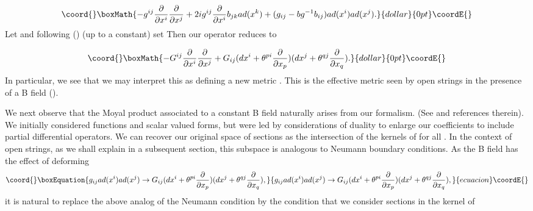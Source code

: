 \documentclass[a4paper,11pt]{amsart}
\begin{document}
$$\coord{}\boxMath{-g^{ij}\frac{\partial}{\partial x^i}\frac{\partial}{\partial x^j}
+ 2ig^{ij}\frac{\partial}{\partial x^i}b_{jk}ad(x^k)
+ (g_{ij}-bg^{-1}b_{ij})ad(x^i)ad(x^j).}{dollar}{0pt}\coordE{}$$ 
Let \coordHE{} and following (\cite{SW})
(up to a constant) set \coordHE{} 
Then our operator reduces to 

$$\coord{}\boxMath{-G^{ij}\frac{\partial}{\partial x^i}\frac{\partial}{\partial x^j}
+ G_{ij}(dx^i+\theta^{pi}\frac{\partial}{\partial x_p})
(dx^j+\theta^{qj}\frac{\partial}{\partial x_q}).}{dollar}{0pt}\coordE{}$$
In particular, we see that we may interpret this as defining a new metric 
\coordHE{}. This is the effective metric seen by open strings in the presence of a B
 field (\cite{SW}).

We next observe that the Moyal product associated to a constant B field 
naturally arises from our formalism. (See \cite{SW} 
and references therein). We initially considered functions and scalar valued 
forms, but were led by considerations of \coordHE{} duality to enlarge our
 coefficients
to include partial differential operators.  We can recover our original space 
of sections as the intersection of the kernels of \coordHE{} for 
all \coordHE{}. In the context of open strings, as we shall explain in a subsequent
section, this subspace is analogous to Neumann
boundary conditions. As the B field has the effect of deforming 
\begin{equation}\coord{}\boxEquation{\label{def1}
g_{ij}ad(x^i)ad(x^j)\rightarrow G_{ij}(dx^i+\theta^{pi}\frac{\partial}{\partial x_p})
(dx^j+\theta^{qj}\frac{\partial}{\partial x_q}),
}{g_{ij}ad(x^i)ad(x^j)\rightarrow G_{ij}(dx^i+\theta^{pi}\frac{\partial}{\partial x_p})
(dx^j+\theta^{qj}\frac{\partial}{\partial x_q}),
}{ecuacion}\coordE{}\end{equation}
it is natural to replace the above analog of the Neumann condition by the
condition that we consider sections in the kernel of 
\coordHE{} 
\end{document}
